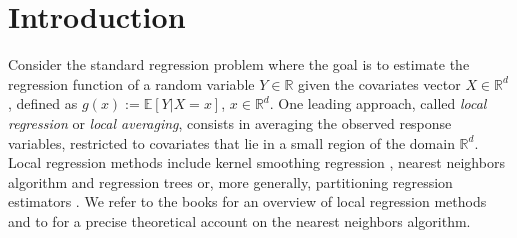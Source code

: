 \documentclass[paper=a4, fontsize=11pt]{scrartcl}
\begin{document}





%

%



\begin{abstract}
 We introduce the concept of shape-regular regression maps as a framework to derive optimal rates of convergence for various non-parametric local regression estimators. Using Vapnik-Chervonenkis theory, we establish upper and lower bounds on the pointwise and the sup-norm estimation error,  even when the localization procedure depends on the full data sample, and under mild conditions on the regression model. Our results demonstrate that the shape regularity of regression maps is not only sufficient but also necessary to achieve an optimal rate of convergence for Lipschitz regression functions. To illustrate the theory, we establish new concentration bounds for many popular local regression methods such as nearest neighbors algorithm, CART-like regression trees and several purely random trees including  Mondrian trees.
\end{abstract}


\section{Introduction}\label{s1}
%
%
Consider the standard regression problem where the goal is to estimate the regression function of a random variable $Y\in \mathbb R$ given the covariates vector $X\in \mathbb R^d$, defined as $ g(x) := \mathbb E [ Y| X= x]$, $x\in \mathbb R ^d$. One leading approach, called \textit{local regression} or \textit{local averaging}, consists in averaging the observed response variables, restricted to covariates that lie in a small region of the domain $\mathbb R ^d$. Local regression methods include kernel smoothing regression \cite{nadaraya1964estimating}, nearest neighbors algorithm \cite{fix1989discriminatory,cover1968estimation} and regression trees or, more generally, partitioning regression estimators \cite{breiman1984classification,nobel}. We refer to the books
\cite{devroye96probabilistic,gyorfi2006distribution} for an overview of local regression methods and to \cite{biau2015lectures} for a precise theoretical account on the nearest neighbors algorithm.
\end{document}
